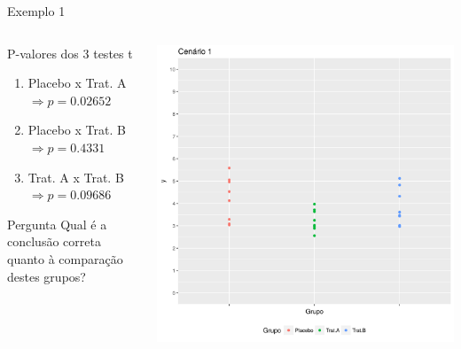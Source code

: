 \documentclass{beamer}
\begin{document}
\begin{frame}{Exemplo 1}
  \begin{columns}
    \begin{column}{5cm}
      \begin{exampleblock}{P-valores dos 3 testes t}
        \tiny
        \begin{enumerate}
        \item Placebo x Trat. A $\Rightarrow p=0.02652$
        \item Placebo x Trat. B $\Rightarrow p=0.4331$
        \item Trat. A x Trat. B $\Rightarrow p=0.09686$
        \end{enumerate}
      \end{exampleblock}
      \begin{exampleblock}{Pergunta}
        \small
        Qual é a conclusão correta quanto à comparação destes grupos?
      \end{exampleblock}
    \end{column}
    \begin{column}{5cm}
      \includegraphics[width=\textwidth]{Cap13-30/cenario1}
    \end{column}
  \end{columns}
\end{frame}
\end{document}
